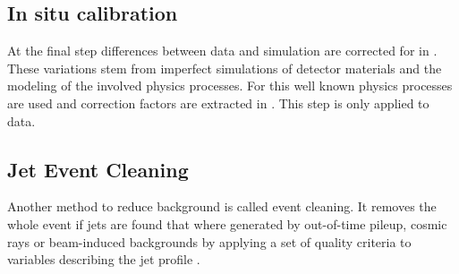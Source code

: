 \subsection{In situ calibration}
At the final step differences between data and simulation are corrected for in \pt. These variations stem from imperfect simulations of detector materials and the modeling of the involved physics processes. For this well known physics processes are used and correction factors are extracted in \pt. This step is only applied to data.

\subsection{Jet Event Cleaning}
Another method to reduce background is called event cleaning. It removes the whole event if jets are found that where generated by out-of-time pileup, cosmic rays or beam-induced backgrounds by applying a set of quality criteria to variables describing the jet profile \citep{ATLAS-CONF-2015-029}.

